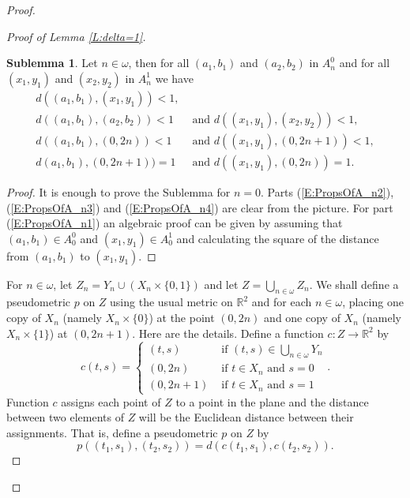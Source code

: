 \documentclass[11pt, reqno]{amsart}
\theoremstyle{definition}
\numberwithin{theorem}{section}
\theoremstyle{definition}
\theoremstyle{definition}
\theoremstyle{definition}
\newtheorem{sublemma}{Sublemma}[theorem]
\theoremstyle{definition}
\theoremstyle{definition}
\numberwithin{claim}{section}
\theoremstyle{definition}
\theoremstyle{definition}
\theoremstyle{definition}
\theoremstyle{definition}
\theoremstyle{definition}
\theoremstyle{remboldstyle}
\begin{document}
\begin{proof}
\begin{proof}[Proof of Lemma \ref{L:delta=1}]
\begin{sublemma}
\label{L:A_0A_1close}
Let $n \in \omega$, then for all $(a_1,b_1)$ and $(a_2, b_2)$ in $A_n^0$ and for all $(x_1,y_1)$ and $(x_2,y_2)$ in $A_n^1$ we have
\begin{align}
\label{E:PropsOfA_n1}
d((a_1,b_1),(x_1,  y_1)) < 1, & \\ 
\label{E:PropsOfA_n2}
d((a_1,b_1), (a_2,b_2)) < 1 &\mbox{ and } d((x_1,y_1), (x_2,y_2)) < 1, \\ 
\label{E:PropsOfA_n3}
d((a_1,b_1),(0,2n)) < 1 &\mbox{ and } d((x_1,y_1),(0,2n+1)) < 1, \\
d(a_1,b_1), (0,2n+1)) = 1 &\mbox{ and } d((x_1,y_1),(0,2n)) = 1.
\label{E:PropsOfA_n4}
\end{align} 
\end{sublemma}
\begin{proof}
It is enough to prove the Sublemma for $n=0$. Parts (\ref{E:PropsOfA_n2}), (\ref{E:PropsOfA_n3}) and (\ref{E:PropsOfA_n4}) are clear from the picture. For part (\ref{E:PropsOfA_n1}) an algebraic proof can be given by assuming that $(a_1,b_1) \in A_0^0$ and $(x_1,y_1) \in A_0^1$ and calculating the square of the distance from $(a_1,b_1)$ to $(x_1,y_1)$.
\end{proof}



For $n \in \omega$, let $Z_n = Y_n \cup \left( X_n \times \{0, 1\}\right)$ and let $Z = \bigcup_{n\in \omega} Z_n$.  We shall define a pseudometric $p$ on $Z$ using the usual metric on $\mathbb{R}^2$ and for each $n \in \omega$, placing one copy of $X_n$ (namely $X_n \times \{ 0 \}$) at the point $(0,2n)$ and one copy of $X_n$ (namely $X_n \times \{ 1 \}$)  at $(0,2n+1)$.  Here are the details. Define a function $c : Z \to \mathbb{R}^2$ by
\[
c(t,s) = \begin{cases}  (t,s) & \mbox{ if } (t, s) \in \bigcup_{n \in \omega} Y_n \\
(0, 2n) & \mbox{ if } t \in X_n \mbox{ and } s = 0 \\
           (0,2n+1) & \mbox{ if } t \in X_n \mbox{ and } s = 1  \end{cases}.
\]
Function $c$ assigns each point of $Z$ to a point in the plane and the distance between two elements of $Z$ will be the Euclidean distance between their assignments.  That is, define a pseudometric $p$ on $Z$ by 
\begin{equation}
\label{D:defOfp}
p((t_1,s_1),(t_2,s_2)) = d(c(t_1,s_1),c(t_2,s_2)).
\end{equation}


\end{proof}
\end{proof}
\end{document}
